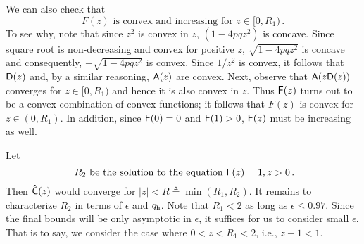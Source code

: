   We can also check that 
  \begin{equation}\label{eq:Fz-convex-increasing}
    \text{$F(z)$ is convex and increasing for $z \in [0, R_1)$}
    \,.
  \end{equation} 
  To see why, note that since $z^2$ is convex in $z$, 
  $(1 - 4pq z^2)$ is concave. 
  Since square root is non-decreasing and convex for positive $z$, 
  $\sqrt{1 - 4pqz^2}$ is concave and consequently, 
  $-\sqrt{1 - 4pqz^2}$ is convex. 
  Since $1/z^2$ is convex, 
  it follows that $\mathsf{D}(z)$ and, by a similar reasoning, $\mathsf{A}(z)$ are convex.
  Next, observe that $\mathsf{A}(z \mathsf{D}(z))$ converges for $z \in [0, R_1)$ 
  and hence it is also convex in $z$. 
  Thus $\mathsf{F}(z)$ turns out to be a convex combination of convex functions; 
  it follows that $F(z)$ is convex for $z \in (0, R_1)$. 
  In addition, 
  since $\mathsf{F}(0) = 0$ and $\mathsf{F}(1) > 0$, 
  $\mathsf{F}(z)$ must be increasing as well. 


  Let $$\text{ $R_2$ be the solution to the equation $\mathsf{F}(z) = 1, z > 0$}\,. $$ 
  Then $\mathsf{\hat{C}}(z)$ would converge for $|z| < R \triangleq \min(R_1, R_2)$. 
  It remains to characterize $R_2$ in terms of $\epsilon$ and $q_{\mathtt{h}}$. 
  Note that $R_1 < 2$ as long as $\epsilon \leq 0.97$.
  Since the final bounds will be only asymptotic in $\epsilon$, 
  it suffices for us to consider small $\epsilon$. 
  That is to say, we consider the case where $0 < z < R_1 < 2$, 
  i.e., $z - 1 < 1$.

